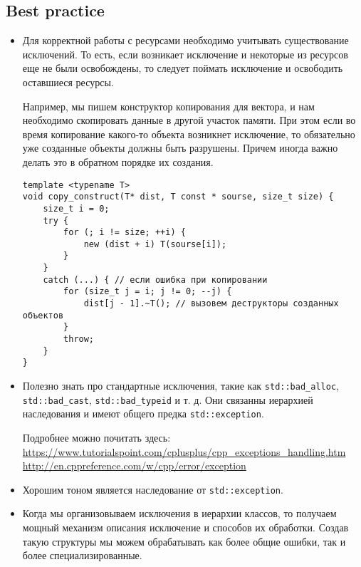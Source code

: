 \subsection{Best practice}
\begin{itemize}
\item
Для корректной работы с ресурсами необходимо учитывать существование исключений. То есть, если возникает исключение и некоторые из ресурсов еще не были освобождены, то следует поймать исключение и освободить оставшиеся ресурсы.

Например, мы пишем конструктор копирования для вектора, и нам необходимо скопировать данные в другой участок памяти. При этом если во время копирование какого-то объекта возникнет исключение, то обязательно уже созданные объекты должны быть разрушены. Причем иногда важно делать это в обратном порядке их создания.
\begin{verbatim}
template <typename T>
void copy_construct(T* dist, T const * sourse, size_t size) {
    size_t i = 0;
    try {
        for (; i != size; ++i) {
            new (dist + i) T(sourse[i]);
        }
    }
    catch (...) { // если ошибка при копировании
        for (size_t j = i; j != 0; --j) {
            dist[j - 1].~T(); // вызовем деструкторы созданных объектов
        }
        throw;
    }
}
\end{verbatim}

\item
Полезно знать про стандартные исключения, такие как  \texttt{std::bad_alloc}, \texttt{std::bad_cast}, \texttt{std::bad_typeid} и т. д. Они связанны иерархией наследования и имеют общего предка \texttt{std::exception}.

Подробнее можно почитать здесь: \\
\url{https://www.tutorialspoint.com/cplusplus/cpp_exceptions_handling.htm} \\
\url{http://en.cppreference.com/w/cpp/error/exception} \\

\item
Хорошим тоном является наследование от \texttt{std::exception}.

\item
Когда мы организовываем исключения в иерархии классов, то получаем мощный механизм описания исключение и способов их обработки. Создав такую структуры мы можем обрабатывать как более общие ошибки, так и более специализированные.


\end{itemize}
